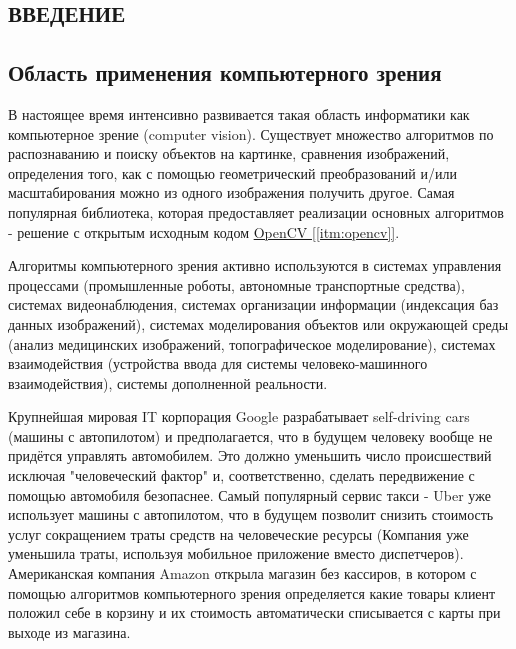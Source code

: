\begin{center}
    \section*{ВВЕДЕНИЕ}    
\end{center}
    \subsection*{Область применения компьютерного зрения}
    
    \tab В настоящее время интенсивно развивается такая область информатики как компьютерное зрение (computer vision). Существует множество алгоритмов по распознаванию и поиску объектов на картинке, сравнения изображений, определения того, как с помощью геометрический преобразований и/или масштабирования можно из одного изображения получить другое. Самая популярная библиотека, которая предоставляет реализации основных алгоритмов - решение с открытым исходным кодом \hyperref[itm:opencv]{OpenCV [\ref{itm:opencv}]}.
    
    Алгоритмы компьютерного зрения активно используются в системах управления процессами (промышленные роботы, автономные транспортные средства), системах видеонаблюдения, системах организации информации (индексация баз данных изображений), системах моделирования объектов или окружающей среды (анализ медицинских изображений, топографическое моделирование), системах взаимодействия (устройства ввода для системы человеко-машинного взаимодействия), системы дополненной реальности.
    
    \vspace{1em}
    
    Крупнейшая мировая IT корпорация Google разрабатывает self-driving cars (машины с автопилотом) и предполагается, что в будущем человеку вообще не придётся управлять автомобилем. Это должно уменьшить число происшествий исключая "человеческий фактор" и, соответственно, сделать передвижение с помощью автомобиля безопаснее. Самый популярный сервис такси - Uber уже использует машины с автопилотом, что в будущем позволит снизить стоимость услуг сокращением траты средств на человеческие ресурсы (Компания уже уменьшила траты, используя мобильное приложение вместо диспетчеров). Американская компания Amazon открыла магазин без кассиров, в котором с помощью алгоритмов компьютерного зрения определяется какие товары клиент положил себе в корзину и их стоимость автоматически списывается с карты при выходе из магазина.
    
